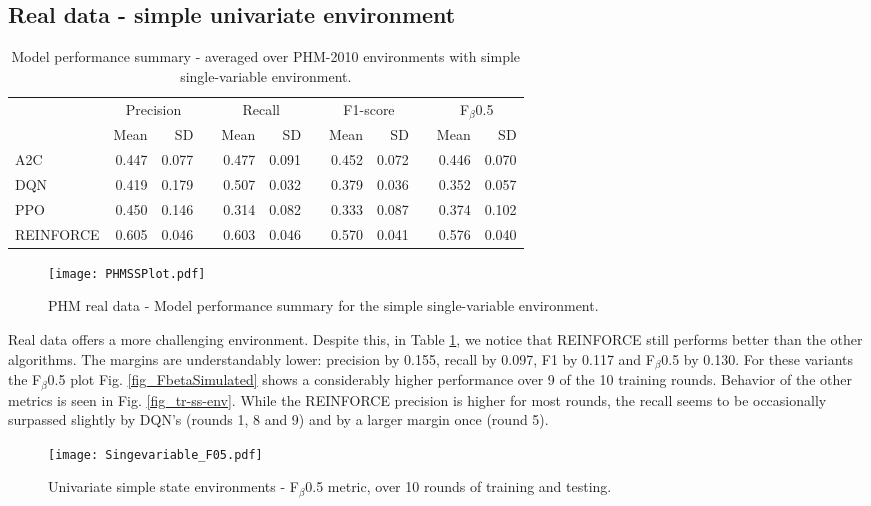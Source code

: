 \documentclass[referee, sn-mathphys-num]{sn-jnl}
\newcommand{\rowspace}[1]{\renewcommand{\arraystretch}{#1}}
\begin{document}
	\subsection{Real data - simple univariate environment}
	\begin{table}
		\rowspace{1.3}
		\caption{Model performance summary - averaged over PHM-2010 environments with simple single-variable environment.}
		{\begin{tabular}{@{}l rr c rr c rr c rr@{}}
				\arrayrulecolor{black!40}\toprule
				& \multicolumn{2}{c}{Precision} & \phantom{i} & \multicolumn{2}{c}{Recall} & \phantom{i} & \multicolumn{2}{c}{F1-score} & \phantom{i} & \multicolumn{2}{c}{F$_\beta$0.5} \\
				\cmidrule{2-3} \cmidrule{5-6} \cmidrule{8-9} \cmidrule{11-12} 
				
				&Mean &SD & &Mean &SD & &Mean &SD& &Mean & SD\\ \midrule
				A2C & 0.447 & 0.077 & &0.477 & 0.091 & & 0.452 & 0.072 & &0.446 &0.070 \\
				DQN & 0.419 & 0.179 & &0.507 & 0.032 & & 0.379 & 0.036 & &0.352 &0.057 \\
				PPO & 0.450 & 0.146 & &0.314 & 0.082 & & 0.333 & 0.087 & &0.374 &0.102 \\
				REINFORCE & \textcolor{dblue}{0.605} & 0.046 & &\textcolor{dblue}{0.603} & 0.046 & & \textcolor{dblue}{0.570} & 0.041 & &\textcolor{dblue}{0.576} &0.040 \\
				
				\bottomrule
		\end{tabular}}
		\label{tbl_PHMSS}
	\end{table}
	\begin{figure}[hbt!]
		\centering
		\texttt{[image: PHMSSPlot.pdf]}  
		\caption{PHM real data - Model performance summary for the simple single-variable environment.}
		\label{fig_PHMSS}
	\end{figure}
	Real data offers a more challenging environment. Despite this, in Table \ref{tbl_PHMSS}, we notice that REINFORCE still performs better than the other algorithms. The margins are understandably lower: precision by 0.155, recall by 0.097, F1 by 0.117 and F$_\beta$0.5 by 0.130. For these variants the F$_\beta$0.5 plot Fig. \ref{fig_FbetaSimulated} shows a considerably higher performance over 9 of the 10 training rounds. Behavior of the other metrics is seen in Fig. \ref{fig_tr-ss-env}. While the REINFORCE precision is higher for most rounds, the recall seems to be occasionally surpassed slightly by DQN's (rounds 1, 8 and 9) and by a larger margin once (round 5).
	\begin{figure}[hbt!]
		\centering
		\texttt{[image: Singevariable\_F05.pdf]}  
		\caption{Univariate simple state environments - F$_\beta$0.5 metric, over 10 rounds of training and testing.}
		\label{fig_FbetaPHMSS}
	\end{figure}
	
\end{document}
